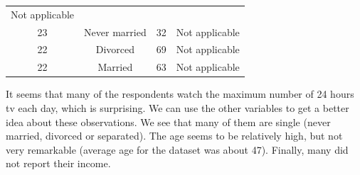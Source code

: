 \documentclass[]{tufte-book}
\begin{document}
\begin{longtable}[]{@{}cccc@{}}
\begin{minipage}[t]{0.21\columnwidth}
Not applicable\strut
\end{minipage}\tabularnewline
\begin{minipage}[t]{0.14\columnwidth}\centering\strut
23\strut
\end{minipage} & \begin{minipage}[t]{0.20\columnwidth}\centering\strut
Never married\strut
\end{minipage} & \begin{minipage}[t]{0.07\columnwidth}\centering\strut
32\strut
\end{minipage} & \begin{minipage}[t]{0.21\columnwidth}\centering\strut
Not applicable\strut
\end{minipage}\tabularnewline
\begin{minipage}[t]{0.14\columnwidth}\centering\strut
22\strut
\end{minipage} & \begin{minipage}[t]{0.20\columnwidth}\centering\strut
Divorced\strut
\end{minipage} & \begin{minipage}[t]{0.07\columnwidth}\centering\strut
69\strut
\end{minipage} & \begin{minipage}[t]{0.21\columnwidth}\centering\strut
Not applicable\strut
\end{minipage}\tabularnewline
\begin{minipage}[t]{0.14\columnwidth}\centering\strut
22\strut
\end{minipage} & \begin{minipage}[t]{0.20\columnwidth}\centering\strut
Married\strut
\end{minipage} & \begin{minipage}[t]{0.07\columnwidth}\centering\strut
63\strut
\end{minipage} & \begin{minipage}[t]{0.21\columnwidth}\centering\strut
Not applicable\strut
\end{minipage}\tabularnewline
\bottomrule
\end{longtable}

It seems that many of the respondents watch the maximum number of 24
hours tv each day, which is surprising. We can use the other variables
to get a better idea about these observations. We see that many of them
are single (never married, divorced or separated). The age seems to be
relatively high, but not very remarkable (average age for the dataset
was about 47). Finally, many did not report their income.
\end{document}
